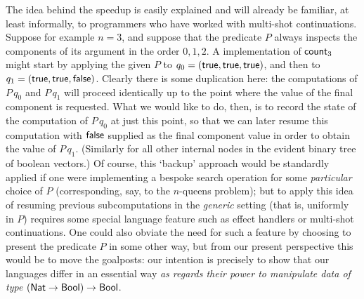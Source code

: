 \documentclass[12pt,phd,lfcs,twoside,openright,logo,leftchapter,normalheadings]{infthesis}
\theoremstyle{plain}
\theoremstyle{definition}
\begin{document}

The idea behind the speedup is easily explained and will already be
familiar, at least informally, to programmers who have worked with
multi-shot continuations.
%
Suppose for example $n=3$, and suppose that the predicate $P$ always
inspects the components of its argument in the order $0,1,2$.
%
A \naive implementation of $\mathsf{count}_3$ might start by applying the given
$P$ to $q_0 = (\mathsf{true},\mathsf{true},\mathsf{true})$, and then to
$q_1 = (\mathsf{true},\mathsf{true},\mathsf{false})$.  Clearly there is some duplication here:
the computations of $P\,q_0$ and $P\,q_1$ will proceed identically up
to the point where the value of the final component is requested. What
we would like to do, then, is to record the state of the computation
of $P\,q_0$ at just this point, so that we can later resume this
computation with $\mathsf{false}$ supplied as the final component value in
order to obtain the value of $P\,q_1$. (Similarly for all other
internal nodes in the evident binary tree of boolean vectors.) Of
course, this `backup' approach would be standardly applied if one were
implementing a bespoke search operation for some \emph{particular}
choice of $P$ (corresponding, say, to the $n$-queens problem); but to
apply this idea of resuming previous subcomputations in the
\emph{generic} setting (that is, uniformly in $P$) requires some
special language feature such as effect handlers or multi-shot
continuations.
%
One could also obviate the need for such a feature by choosing to
present the predicate $P$ in some other way, but from our present
perspective this would be to move the goalposts: our intention is
precisely to show that our languages differ in an essential way
\emph{as regards their power to manipulate data of type} $(\mathsf{Nat} \to
\mathsf{Bool}) \to \mathsf{Bool}$.
\end{document}
